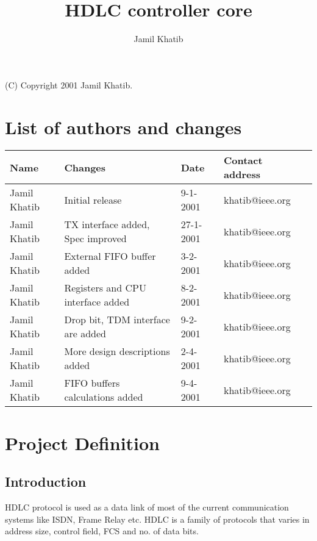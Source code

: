 \documentclass[a4paper,11pt]{article}
\author{Jamil Khatib}
\title{HDLC controller core}
\newcommand{\addauthor}[4]{#1 & #2 & #3 & #4 \\ \hline}
\begin{document}
\maketitle
 
\begin{center}(C) Copyright 2001 Jamil Khatib.\end{center}
 
\thispagestyle{empty}
 
\newpage
 
 
\tableofcontents
 
\newpage
 
\section{List of authors and changes}
 
\begin{tabular}{|l|l|l|l|l|}
\hline
Name & Changes & Date & Contact address\\
\hline
\hline 
 
\addauthor{Jamil Khatib}{Initial release}{9-1-2001}{khatib@ieee.org}
\addauthor{Jamil Khatib}{TX interface added, Spec improved}{27-1-2001}{khatib@ieee.org}
\addauthor{Jamil Khatib}{External FIFO buffer added}{3-2-2001}{khatib@ieee.org}
\addauthor{Jamil Khatib}{Registers and CPU interface added}{8-2-2001}{khatib@ieee.org}
\addauthor{Jamil Khatib}{Drop bit, TDM interface are added}{9-2-2001}{khatib@ieee.org}
\addauthor{Jamil Khatib}{More design descriptions added}{2-4-2001}{khatib@ieee.org}
\addauthor{Jamil Khatib}{FIFO buffers calculations added}{9-4-2001}{khatib@ieee.org}
 
 
\end{tabular}
 
\newpage
 
\section{Project Definition}
 
\subsection{Introduction}
HDLC protocol is used as a data link of most of the current communication systems like ISDN, Frame Relay etc.  HDLC is a family of protocols that varies in address size, control field, FCS and no. of data bits.
 
\end{document}
